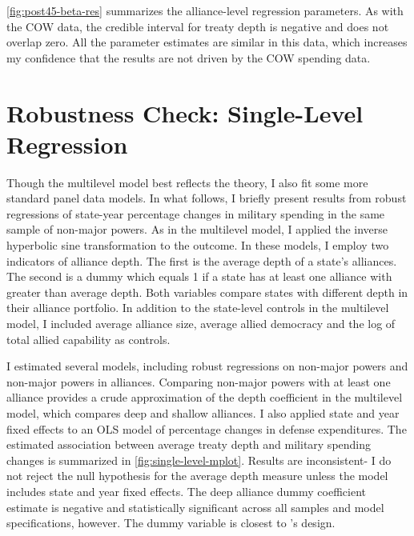 \documentclass[12pt]{article}
\begin{document}
\autoref{fig:post45-beta-res} summarizes the alliance-level regression parameters. 
As with the COW data, the credible interval for treaty depth is negative and does not overlap zero. 
All the parameter estimates are similar in this data, which increases my confidence that the results are not driven by the COW spending data. 

 


\section{Robustness Check: Single-Level Regression}


Though the multilevel model best reflects the theory, I also fit some more standard panel data models. 
In what follows, I briefly present results from robust regressions of state-year percentage changes in military spending in the same sample of non-major powers. 
As in the multilevel model, I applied the inverse hyperbolic sine transformation to the outcome. 
In these models, I employ two indicators of alliance depth. 
The first is the average depth of a state's alliances. 
The second is a dummy which equals 1 if a state has at least one alliance with greater than average depth. 
Both variables compare states with different depth in their alliance portfolio. 
In addition to the state-level controls in the multilevel model, I included average alliance size, average allied democracy and the log of total allied capability as controls. 


I estimated several models, including robust regressions on non-major powers and non-major powers in alliances. 
Comparing non-major powers with at least one alliance provides a crude approximation of the depth coefficient in the multilevel model, which compares deep and shallow alliances. 
I also applied state and year fixed effects to an OLS model of percentage changes in defense expenditures. 
The estimated association between average treaty depth and military spending changes is summarized in \autoref{fig:single-level-mplot}. 
Results are inconsistent- I do not reject the null hypothesis for the average depth measure unless the model includes state and year fixed effects. 
The deep alliance dummy coefficient estimate is negative and statistically significant across all samples and model specifications, however. 
The dummy variable is closest to \citet{DigiuseppePoast2016}'s design. 
\end{document}
